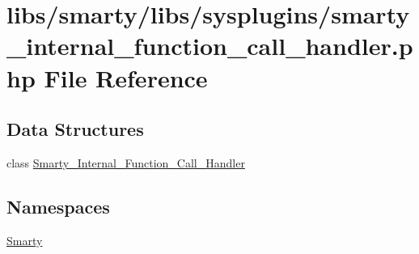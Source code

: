 \hypertarget{smarty__internal__function__call__handler_8php}{}\section{libs/smarty/libs/sysplugins/smarty\+\_\+internal\+\_\+function\+\_\+call\+\_\+handler.php File Reference}
\label{smarty__internal__function__call__handler_8php}
\subsection*{Data Structures}
\begin{DoxyCompactItemize}
\item 
class \hyperlink{class_smarty___internal___function___call___handler}{Smarty\+\_\+\+Internal\+\_\+\+Function\+\_\+\+Call\+\_\+\+Handler}
\end{DoxyCompactItemize}
\subsection*{Namespaces}
\begin{DoxyCompactItemize}
\item 
 \hyperlink{namespace_smarty}{Smarty}
\end{DoxyCompactItemize}
